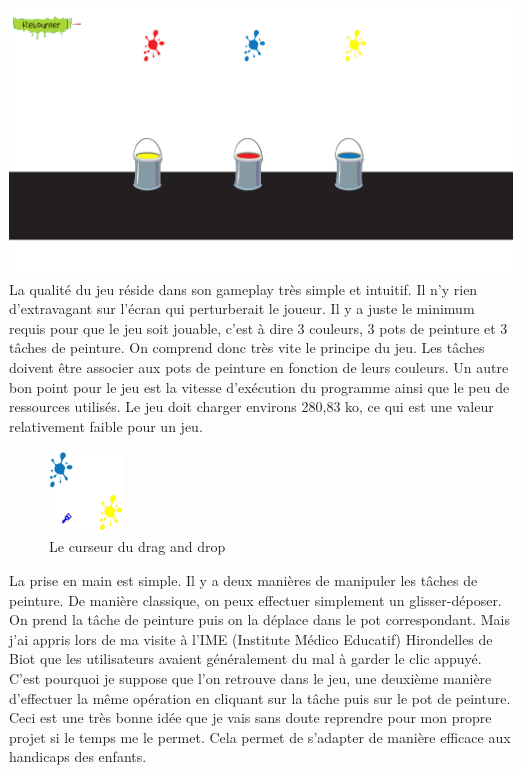 \documentclass{article}
\begin{document}
\vspace{0.5cm}
\includegraphics[width=\textwidth]{4}\\
\hspace*{0.6cm}La qualité du jeu réside dans son gameplay très simple et intuitif. Il n'y rien d'extravagant sur l'écran qui perturberait le joueur. Il y a juste le minimum requis pour que le jeu soit jouable, c'est à dire 3 couleurs, 3 pots de peinture et 3 tâches de peinture. On comprend donc très vite le principe du jeu. Les t\^aches doivent être associer aux pots de peinture en fonction de leurs couleurs. Un autre bon point pour le jeu est la vitesse d'exécution du programme ainsi que le peu de ressources utilisés. Le jeu doit charger environs 280,83 ko, ce qui est une valeur relativement faible pour un jeu.\\

\begin{figure}
  \vspace{-20pt}
  \begin{center}
    \includegraphics[width=0.18\textwidth]{10}
  \end{center}
  \vspace{-20pt}
  \caption{Le curseur du drag and drop}
  \vspace{-10pt}
\end{figure}

La prise en main est simple. Il y a deux manières de manipuler les tâches de peinture. De manière classique, on peux effectuer simplement un glisser-déposer. On prend la t\^ache de peinture puis on la déplace dans le pot correspondant. Mais j'ai appris lors de ma visite à l'IME (Institute Médico Educatif) Hirondelles de Biot que les utilisateurs avaient généralement du mal à garder le clic appuyé. C'est pourquoi je suppose que l'on retrouve dans le jeu, une deuxième manière d'effectuer la même opération en cliquant sur la tâche puis sur le pot de peinture. Ceci est une très bonne idée que je vais sans doute reprendre pour mon propre projet si le temps me le permet. Cela permet de s'adapter de manière efficace aux handicaps des enfants.\\
\end{document}
